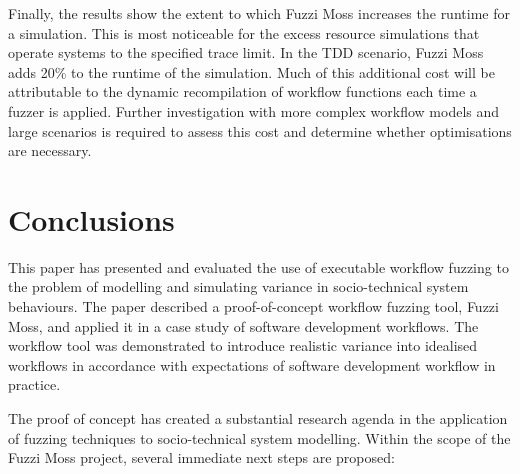 \documentclass{sig-alternate}
\begin{document}
Finally, the results show the extent to which Fuzzi Moss increases the runtime
for a simulation.  This is most noticeable for the excess resource simulations
that operate systems to the specified trace limit.  In the TDD scenario, Fuzzi
Moss adds 20\% to the runtime of the simulation.  Much of this additional cost
will be attributable to the dynamic recompilation of workflow functions each
time a fuzzer is applied.  Further investigation with more complex workflow
models and large scenarios is required to assess this cost and determine whether
optimisations are necessary.



\section{Conclusions}
\label{sec:conclusions}


This paper has presented and evaluated the use of executable workflow fuzzing to
the problem of modelling and simulating variance in socio-technical system
behaviours.  The paper described a proof-of-concept workflow fuzzing tool, Fuzzi
Moss, and applied it in a case study of software development workflows.  The
workflow tool was demonstrated to introduce realistic variance into idealised
workflows in accordance with expectations of software development workflow in
practice.

The proof of concept has created a substantial research agenda in the
application of fuzzing techniques to socio-technical system modelling.  Within
the scope of the Fuzzi Moss project, several immediate next steps are proposed:
\end{document}
